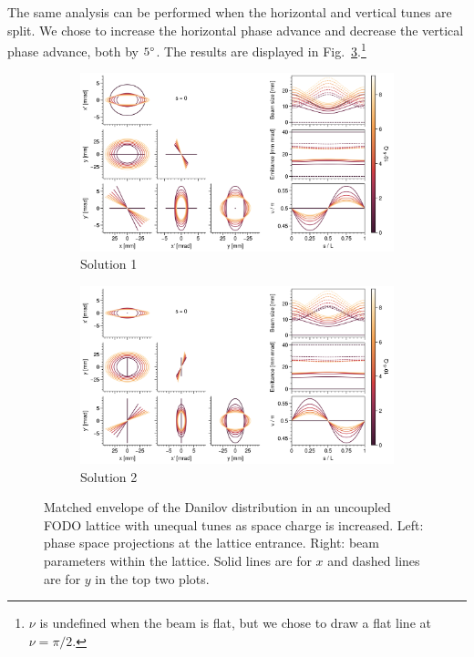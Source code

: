 The same analysis can be performed when the horizontal and vertical tunes are split. We chose to increase the horizontal phase advance and decrease the vertical phase advance, both by $5\degree$. The results are displayed in Fig.~\ref{fig:matched_vs_sc_fodo_split}.\footnote{$\nu$ is undefined when the beam is flat, but we chose to draw a flat line at $\nu = \pi/2$.}
%
\begin{figure}[!p]
    \begin{subfigure}{1.0\textwidth}
        \includegraphics[width=\textwidth]{Images/chapter2/matched_vs_sc_fodo_split_mode1.png}
        \caption{Solution 1}
        \label{fig:matched_vs_sc_fodo_split_a}
    \end{subfigure}
    \vfill
    \vfill
    \begin{subfigure}{1.0\textwidth}
        \centering
        \includegraphics[width=\textwidth]{Images/chapter2/matched_vs_sc_fodo_split_mode2.png}
        \caption{Solution 2}
        \label{fig:matched_vs_sc_fodo_split_b}
    \end{subfigure}
    \caption{Matched envelope of the Danilov distribution in an uncoupled FODO lattice with unequal tunes as space charge is increased. Left: phase space projections at the lattice entrance. Right: beam parameters within the lattice. Solid lines are for $x$ and dashed lines are for $y$ in the top two plots.}
    \label{fig:matched_vs_sc_fodo_split}
\end{figure}

